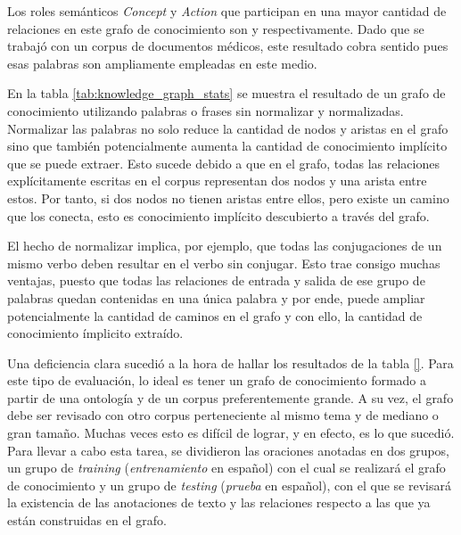 Los roles semánticos \textit{Concept} y \textit{Action} que participan en una mayor cantidad de relaciones en este grafo de conocimiento son  y  respectivamente. Dado que se trabajó con un corpus de documentos médicos, este resultado cobra sentido pues esas palabras son ampliamente empleadas en este medio.

En la tabla \ref{tab:knowledge_graph_stats} se muestra el resultado de un grafo de conocimiento utilizando palabras o frases sin normalizar y normalizadas. Normalizar las palabras no solo reduce la cantidad de nodos y aristas en el grafo sino que también potencialmente aumenta la cantidad de conocimiento implícito que se puede extraer. Esto sucede debido a que en el grafo, todas las relaciones explícitamente escritas en el corpus representan dos nodos y una arista entre estos. Por tanto, si dos nodos no tienen aristas entre ellos, pero existe un camino que los conecta, esto es conocimiento implícito descubierto a través del grafo.

El hecho de normalizar implica, por ejemplo, que todas las conjugaciones de un mismo verbo deben resultar en el verbo sin conjugar. Esto trae consigo muchas ventajas, puesto que todas las relaciones de entrada y salida de ese grupo de palabras quedan contenidas en una única palabra y por ende, puede ampliar potencialmente la cantidad de caminos en el grafo y con ello, la cantidad de conocimiento ímplicito extraído.

Una deficiencia clara sucedió a la hora de hallar los resultados de la tabla \ref{}. Para este tipo de evaluación, lo ideal es tener un grafo de conocimiento formado a partir de una ontología y de un corpus preferentemente grande. A su vez, el grafo debe ser revisado con otro corpus perteneciente al mismo tema y de mediano o gran tamaño. Muchas veces esto es difícil de lograr, y en efecto, es lo que sucedió. Para llevar a cabo esta tarea, se dividieron las oraciones anotadas en dos grupos, un grupo de \textit{training} (\textit{entrenamiento} en español) con el cual se realizará el grafo de conocimiento y un grupo de \textit{testing} (\textit{prueba} en español), con el que se revisará la existencia de las anotaciones de texto y las relaciones respecto a las que ya están construidas en el grafo.